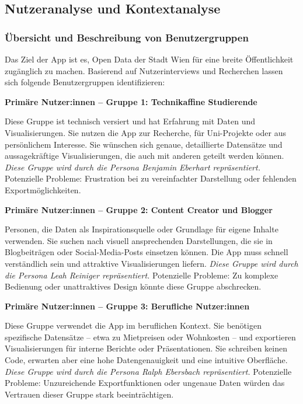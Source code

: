 \subsection{Nutzeranalyse und Kontextanalyse}

\subsubsection{Übersicht und Beschreibung von Benutzergruppen}

\smallskip
\noindent
Das Ziel der App ist es, Open Data der Stadt Wien für eine breite Öffentlichkeit zugänglich zu machen.
Basierend auf Nutzerinterviews und Recherchen lassen sich folgende Benutzergruppen identifizieren:

\medskip
\noindent\textbf{Primäre Nutzer:innen -- Gruppe 1: Technikaffine Studierende}

\smallskip
\noindent
Diese Gruppe ist technisch versiert und hat Erfahrung mit Daten und Visualisierungen.
Sie nutzen die App zur Recherche, für Uni-Projekte oder aus persönlichem Interesse.
Sie wünschen sich genaue, detaillierte Datensätze und aussagekräftige Visualisierungen, die auch mit anderen geteilt werden können.
\textit{Diese Gruppe wird durch die Persona Benjamin Eberhart repräsentiert.}
Potenzielle Probleme: Frustration bei zu vereinfachter Darstellung oder fehlenden Exportmöglichkeiten.

\medskip
\noindent\textbf{Primäre Nutzer:innen -- Gruppe 2: Content Creator und Blogger}

\smallskip
\noindent
Personen, die Daten als Inspirationsquelle oder Grundlage für eigene Inhalte verwenden.
Sie suchen nach visuell ansprechenden Darstellungen, die sie in Blogbeiträgen oder Social-Media-Posts einsetzen können.
Die App muss schnell verständlich sein und attraktive Visualisierungen liefern.
\textit{Diese Gruppe wird durch die Persona Leah Reiniger repräsentiert.}
Potenzielle Probleme: Zu komplexe Bedienung oder unattraktives Design könnte diese Gruppe abschrecken.

\medskip
\noindent\textbf{Primäre Nutzer:innen -- Gruppe 3: Berufliche Nutzer:innen}

\smallskip
\noindent
Diese Gruppe verwendet die App im beruflichen Kontext.
Sie benötigen spezifische Datensätze -- etwa zu Mietpreisen oder Wohnkosten -- und exportieren Visualisierungen für interne Berichte oder Präsentationen.
Sie schreiben keinen Code, erwarten aber eine hohe Datengenauigkeit und eine intuitive Oberfläche.
\textit{Diese Gruppe wird durch die Persona Ralph Ebersbach repräsentiert.}
Potenzielle Probleme: Unzureichende Exportfunktionen oder ungenaue Daten würden das Vertrauen dieser Gruppe stark beeinträchtigen.

